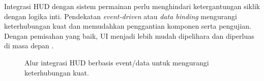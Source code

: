 \documentclass[../main.tex]{subfiles}
\begin{document}
Integrasi HUD dengan sistem permainan perlu menghindari ketergantungan siklik dengan logika inti. Pendekatan \textit{event-driven} atau \textit{data binding} mengurangi keterhubungan kuat dan memudahkan penggantian komponen serta pengujian. Dengan pemisahan yang baik, UI menjadi lebih mudah dipelihara dan diperluas di masa depan \parencite{unity-ui}.

\begin{figure}[h]
  \centering
  \caption{Alur integrasi HUD berbasis event/data untuk mengurangi keterhubungan kuat.}
\end{figure}

\onlyinsubfile{\printbibliography}
\end{document}

